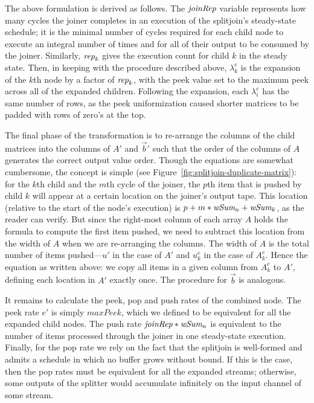 {The above formulation is derived as follows.  The $\mbox{\it joinRep}$
variable represents how many cycles the joiner completes in an
execution of the splitjoin's steady-state schedule; it is
the minimal number of cycles required for each child node to execute
an integral number of times and for all of their output to be consumed
by the joiner. Similarly, $\mbox{\it rep}_k$ gives the execution count for
child $k$ in the steady state.  Then, in keeping with the procedure
described above, $\lambda_k^e$ is the expansion of the $k$th node by
a factor of $\mbox{\it rep}_k$, with the peek value set to the maximum peek
across all of the expanded children.  Following the expansion, each
$\lambda_i^e$ has the same number of rows, as the peek uniformization
caused shorter matrices to be padded with rows of zero's at the top.

The final phase of the transformation is to re-arrange the columns of
the child matrices into the columns of $A'$ and $\vec{b}'$ such that
the order of the columns of $A$ generates the correct output value
order.  Though the equations are somewhat cumbersome, the concept is
simple (see Figure~\ref{fig:splitjoin-duplicate-matrix}): for the
$k$th child and the $m$th cycle of the joiner, the $p$th item that is
pushed by child $k$ will appear at a certain location on the joiner's
output tape.  This location (relative to the start of the node's
execution) is $p + m * \mbox{\it wSum}_n + \mbox{\it wSum}_k$, as the reader can
verify.  But since the right-most column of each array $A$ holds the
formula to compute the first item pushed, we need to subtract this
location from the width of $A$ when we are re-arranging the
columns. The width of $A$ is the total number of items pushed---$u'$
in the case of $A'$ and $u_k^e$ in the case of $A_k^e$.  Hence the
equation as written above: we copy all items in a given column from
$A_k^e$ to $A'$, defining each location in $A'$ exactly once.  The
procedure for $\vec{b}$ is analogous.

It remains to calculate the peek, pop and push rates of the combined
node.  The peek rate $e'$ is simply $maxPeek$, which we defined to be
equivalent for all the expanded child nodes.  The push rate
$\mbox{\it joinRep}*\mbox{\it wSum}_n$ is equivalent to the number of items
processed through the joiner in one steady-state execution.  Finally,
for the pop rate we rely on the fact that the splitjoin is well-formed
and admits a schedule in which no buffer grows without bound.  If this
is the case, then the pop rates must be equivalent for all the
expanded streams; otherwise, some outputs of the splitter would
accumulate infinitely on the input channel of some stream.

}
